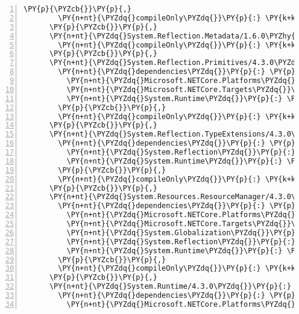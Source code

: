 \begin{Verbatim}[commandchars=\\\{\},numbers=left,firstnumber=1,stepnumber=1,numberblanklines=0]
        \PY{p}{\PYZcb{}}\PY{p}{,}
        \PY{n+nt}{\PYZdq{}compileOnly\PYZdq{}}\PY{p}{:} \PY{k+kc}{true}
      \PY{p}{\PYZcb{}}\PY{p}{,}
      \PY{n+nt}{\PYZdq{}System.Reflection.Metadata/1.6.0\PYZhy{}rc1\PYZdq{}}\PY{p}{:} \PY{p}{\PYZob{}}
        \PY{n+nt}{\PYZdq{}compileOnly\PYZdq{}}\PY{p}{:} \PY{k+kc}{true}
      \PY{p}{\PYZcb{}}\PY{p}{,}
      \PY{n+nt}{\PYZdq{}System.Reflection.Primitives/4.3.0\PYZdq{}}\PY{p}{:} \PY{p}{\PYZob{}}
        \PY{n+nt}{\PYZdq{}dependencies\PYZdq{}}\PY{p}{:} \PY{p}{\PYZob{}}
          \PY{n+nt}{\PYZdq{}Microsoft.NETCore.Platforms\PYZdq{}}\PY{p}{:} \PY{l+s+s2}{\PYZdq{}2.1.0\PYZhy{}rc1\PYZdq{}}\PY{p}{,}
          \PY{n+nt}{\PYZdq{}Microsoft.NETCore.Targets\PYZdq{}}\PY{p}{:} \PY{l+s+s2}{\PYZdq{}2.1.0\PYZhy{}rc1\PYZdq{}}\PY{p}{,}
          \PY{n+nt}{\PYZdq{}System.Runtime\PYZdq{}}\PY{p}{:} \PY{l+s+s2}{\PYZdq{}4.3.0\PYZdq{}}
        \PY{p}{\PYZcb{}}\PY{p}{,}
        \PY{n+nt}{\PYZdq{}compileOnly\PYZdq{}}\PY{p}{:} \PY{k+kc}{true}
      \PY{p}{\PYZcb{}}\PY{p}{,}
      \PY{n+nt}{\PYZdq{}System.Reflection.TypeExtensions/4.3.0\PYZdq{}}\PY{p}{:} \PY{p}{\PYZob{}}
        \PY{n+nt}{\PYZdq{}dependencies\PYZdq{}}\PY{p}{:} \PY{p}{\PYZob{}}
          \PY{n+nt}{\PYZdq{}System.Reflection\PYZdq{}}\PY{p}{:} \PY{l+s+s2}{\PYZdq{}4.3.0\PYZdq{}}\PY{p}{,}
          \PY{n+nt}{\PYZdq{}System.Runtime\PYZdq{}}\PY{p}{:} \PY{l+s+s2}{\PYZdq{}4.3.0\PYZdq{}}
        \PY{p}{\PYZcb{}}\PY{p}{,}
        \PY{n+nt}{\PYZdq{}compileOnly\PYZdq{}}\PY{p}{:} \PY{k+kc}{true}
      \PY{p}{\PYZcb{}}\PY{p}{,}
      \PY{n+nt}{\PYZdq{}System.Resources.ResourceManager/4.3.0\PYZdq{}}\PY{p}{:} \PY{p}{\PYZob{}}
        \PY{n+nt}{\PYZdq{}dependencies\PYZdq{}}\PY{p}{:} \PY{p}{\PYZob{}}
          \PY{n+nt}{\PYZdq{}Microsoft.NETCore.Platforms\PYZdq{}}\PY{p}{:} \PY{l+s+s2}{\PYZdq{}2.1.0\PYZhy{}rc1\PYZdq{}}\PY{p}{,}
          \PY{n+nt}{\PYZdq{}Microsoft.NETCore.Targets\PYZdq{}}\PY{p}{:} \PY{l+s+s2}{\PYZdq{}2.1.0\PYZhy{}rc1\PYZdq{}}\PY{p}{,}
          \PY{n+nt}{\PYZdq{}System.Globalization\PYZdq{}}\PY{p}{:} \PY{l+s+s2}{\PYZdq{}4.3.0\PYZdq{}}\PY{p}{,}
          \PY{n+nt}{\PYZdq{}System.Reflection\PYZdq{}}\PY{p}{:} \PY{l+s+s2}{\PYZdq{}4.3.0\PYZdq{}}\PY{p}{,}
          \PY{n+nt}{\PYZdq{}System.Runtime\PYZdq{}}\PY{p}{:} \PY{l+s+s2}{\PYZdq{}4.3.0\PYZdq{}}
        \PY{p}{\PYZcb{}}\PY{p}{,}
        \PY{n+nt}{\PYZdq{}compileOnly\PYZdq{}}\PY{p}{:} \PY{k+kc}{true}
      \PY{p}{\PYZcb{}}\PY{p}{,}
      \PY{n+nt}{\PYZdq{}System.Runtime/4.3.0\PYZdq{}}\PY{p}{:} \PY{p}{\PYZob{}}
        \PY{n+nt}{\PYZdq{}dependencies\PYZdq{}}\PY{p}{:} \PY{p}{\PYZob{}}
          \PY{n+nt}{\PYZdq{}Microsoft.NETCore.Platforms\PYZdq{}}\PY{p}{:} \PY{l+s+s2}{\PYZdq{}2.1.0\PYZhy{}rc1\PYZdq{}}\PY{p}{,}

\end{Verbatim}
